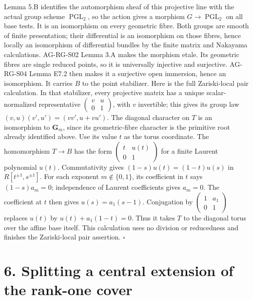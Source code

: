 \documentclass[11pt,a4paper,openany]{report}
\begin{document}
Lemma 5.B identifies the automorphism sheaf of this projective line with the actual group scheme \(\operatorname{PGL}_2\), so the action gives a morphism \(G\to\operatorname{PGL}_2\) on all base tests. It is an isomorphism on every geometric fibre. Both groups are smooth of finite presentation; their differential is an isomorphism on those fibres, hence locally an isomorphism of differential bundles by the finite matrix and Nakayama calculations. AG-RG-S02 Lemma 3.A makes the morphism etale. Its geometric fibres are single reduced points, so it is universally injective and surjective. AG-RG-S04 Lemma E7.2 then makes it a surjective open immersion, hence an isomorphism. It carries \(B\) to the point stabilizer. Here is the full Zariski-local pair calculation. In that stabilizer, every projective matrix has a unique scalar-normalized representative \(\left(\begin{smallmatrix}v&u\\0&1\end{smallmatrix}\right)\), with \(v\) invertible; this gives its group law \((v,u)(v',u')=(vv',u+vu')\). The diagonal character on \(T\) is an isomorphism to \(\mathbf G_m\), since its geometric-fibre character is the primitive root already identified above. Use its value \(t\) as the torus coordinate. The homomorphism \(T\to B\) has the form \(\left(\begin{smallmatrix}t&u(t)\\0&1\end{smallmatrix}\right)\) for a finite Laurent polynomial \(u(t)\). Commutativity gives \((1-s)u(t)=(1-t)u(s)\) in \(R[t^{\pm1},s^{\pm1}]\). For each exponent \(m\notin\{0,1\}\), its coefficient in \(t\) says \((1-s)a_m=0\); independence of Laurent coefficients gives \(a_m=0\). The coefficient at \(t\) then gives \(u(s)=a_1(s-1)\). Conjugation by \(\left(\begin{smallmatrix}1&a_1\\0&1\end{smallmatrix}\right)\) replaces \(u(t)\) by \(u(t)+a_1(1-t)=0\). Thus it takes \(T\) to the diagonal torus over the affine base itself. This calculation uses no division or reducedness and finishes the Zariski-local pair assertion. \(\square\)

\section{6. Splitting a central extension of the rank-one cover}\label{AG-RG-03-splitting-a-central-extension-of-the-rank-one-cover}
\end{document}
